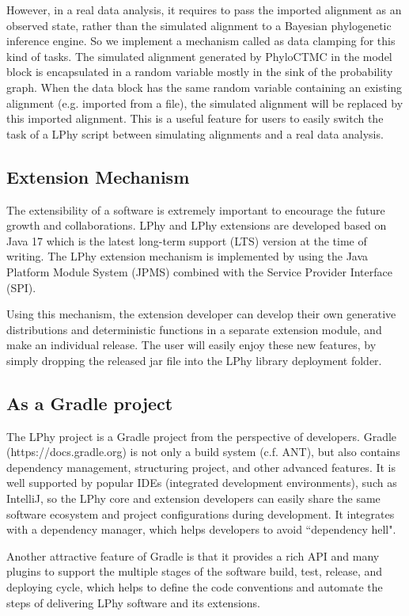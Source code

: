 \documentclass[10pt,letterpaper,table]{article}
\begin{document}
{However, in a real data analysis, it requires to pass the imported alignment as an observed state, rather than the simulated alignment to a Bayesian phylogenetic inference engine. So we implement a mechanism called as data clamping for this kind of tasks. 
The simulated alignment generated by PhyloCTMC in the model block is encapsulated in a random variable mostly in the sink of the probability graph. 
When the data block has the same random variable containing an existing alignment (e.g. imported from a file), the simulated alignment will be replaced by this imported alignment. 
This is a useful feature for users to easily switch the task of a LPhy script between simulating alignments and a real data analysis. 


\subsection{Extension Mechanism}
The extensibility of a software is extremely important to encourage the future growth and collaborations. 
LPhy and LPhy extensions are developed based on Java 17 which is the latest long-term support (LTS) version at the time of writing. 
The LPhy extension mechanism is implemented by using the Java Platform Module System (JPMS) combined with the Service Provider Interface (SPI).

Using this mechanism, the extension developer can develop their own generative distributions and deterministic functions in a separate extension module, and make an individual release.
The user will easily enjoy these new features, by simply dropping the released jar file into the LPhy library deployment folder.

\subsection{As a Gradle project}
The LPhy project is a Gradle project from the perspective of developers. Gradle (https://docs.gradle.org) is not only a build system (c.f. ANT), but also contains dependency management, structuring project, and other advanced features. 
It is well supported by popular IDEs (integrated development environments), such as IntelliJ, so the LPhy core and extension developers can easily share the same software ecosystem and project configurations during development. 
It integrates with a dependency manager, which helps developers to avoid ``dependency hell". 

Another attractive feature of Gradle is that it provides a rich API and many plugins to support the multiple stages of the software build, test, release, and deploying cycle, which helps to define the code conventions and automate the steps of delivering LPhy software and its extensions.  

}
\end{document}

